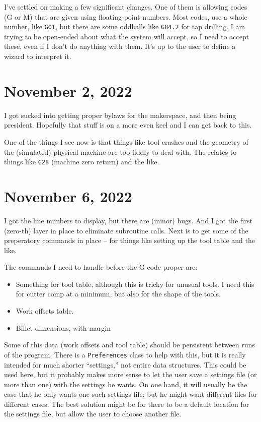 \documentclass{article}
\begin{document}
I've settled on making a few significant changes. One of them is
allowing codes (G or M) that are given using floating-point
numbers. Most codes, use a whole number, like {\tt G01}, but there are
some oddballs like {\tt G84.2} for tap drilling. I am trying to be
open-ended about what the system will accept, so I need to accept
these, even if I don't do anything with them. It's up to the user to
define a wizard to interpret it.

\section{November 2, 2022}

I got sucked into getting proper bylaws for the makerspace, and then
being president. Hopefully that stuff is on a more even keel and I can
get back to this.

One of the things I see now is that things like tool crashes and the
geometry of the (simulated) physical machine are too fiddly to deal
with. The relates to things like {\tt G28} (machine zero return) and
the like. 

\section{November 6, 2022}

I got the line numbers to display, but there are (minor) bugs. And I
got the first (zero-th) layer in place to eliminate subroutine
calls. Next is to get some of the preperatory commands in place -- for
things like setting up the tool table and the like.

The commands I need to handle before the G-code proper are:
\begin{itemize}
\item Something for tool table, although this is tricky for unusual
  tools. I need this for cutter comp at a minimum, but also for the
  shape of the tools.
\item Work offsets table.
\item Billet dimensions, with margin
\end{itemize}
Some of this data (work offsets and tool table) should be persistent
between runs of the program. There is a {\tt Preferences} class to
help with this, but it is really intended for much shorter
``settings,'' not entire data structures. This could be used here, but
it probably makes more sense to let the user save a settings file (or
more than one) with the settings he wants. On one hand, it will
usually be the case that he only wants one such settings file; but he
might want different files for different cases. The best solution
might be for there to be a default location for the settings file, but
allow the user to choose another file.
\end{document}
